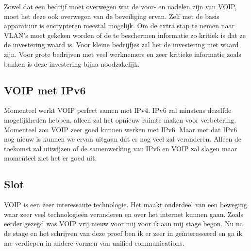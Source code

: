 \documentclass[pdftex,a4paper,12pt,twoside]{report}
\begin{document}
Zowel dat een bedrijf moet overwegen wat de voor- en nadelen zijn van VOIP, moet het deze ook overwegen van de beveiliging ervan. Zelf met de basis apparatuur is encrypteren meestal mogelijk. Om de extra stap te nemen naar VLAN's moet gekeken worden of de te beschermen informatie zo kritiek is dat ze de investering waard is. Voor kleine bedrijfjes zal het de investering niet waard zijn. Voor grote bedrijven met veel werknemers en zeer kritieke informatie zoals banken is deze investering bijna noodzakelijk.
\subsection{VOIP met IPv6}
Momenteel werkt VOIP perfect samen met IPv4. IPv6 zal minstens dezelfde mogelijkheden hebben, alleen zal het opnieuw ruimte maken voor verbetering. Momenteel zou VOIP zeer goed kunnen werken met IPv6. Maar met dat IPv6 nog nieuw is kunnen we ervan uitgaan dat er nog veel zal veranderen. Alleen de toekomst zal uitwijzen of de samenwerking van IPv6 en VOIP zal slagen maar momenteel ziet het er goed uit.
\subsection{Slot}
VOIP is een zeer interessante technologie. Het maakt onderdeel van een beweging waar zeer veel technologieën veranderen en over het internet kunnen gaan. Zoals eerder gezegd was VOIP vrij nieuw voor mij voor ik aan mij stage begon. Nu na de stage en het schrijven van deze proef ben ik er zeer in geïnteresseerd en ga ik me verdiepen in andere vormen van unified communications.



\nocite{*}




\listoffigures
\end{document}

